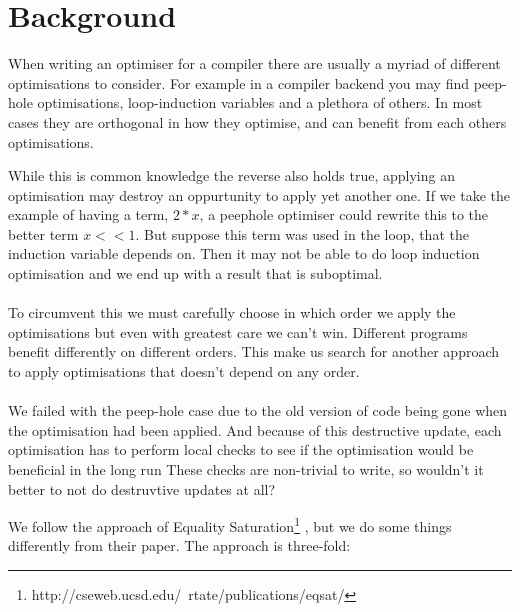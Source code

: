 
\section{Background}
When writing an optimiser for a compiler there are usually a myriad of different optimisations to consider.
For example in a compiler backend you may find peep-hole
optimisations, loop-induction variables and a plethora of others. In most cases 
they are orthogonal in how they optimise, and can benefit from each others optimisations.

While this is common knowledge the reverse also holds true, applying an optimisation 
may destroy an oppurtunity to apply yet another one. If we take the example of having a 
term, $ 2 * x $, a peephole optimiser could rewrite this to the better term 
$ x << 1$. But suppose this term was used in the loop, that the induction variable
depends on. Then it may not be able to do loop induction optimisation and we end up
with a result that is suboptimal.%
\paragraph{}
To circumvent this we must carefully choose in which order we apply the optimisations
but even with greatest care we can't win. Different programs benefit differently
on different orders. This make us search for another approach to apply optimisations
that doesn't depend on any order. 
\paragraph{}
We failed with the peep-hole case due to the old version of code being gone when 
the optimisation had been applied.
And because of this destructive update, each
optimisation has to perform local checks to see if the optimisation would be beneficial in the long run %
These checks are non-trivial to write, so wouldn't it better to not do destruvtive
updates at all?

We follow the approach of Equality Saturation\footnote{http://cseweb.ucsd.edu/~rtate/publications/eqsat/}
, but we do some things differently from their paper. The approach is three-fold:

